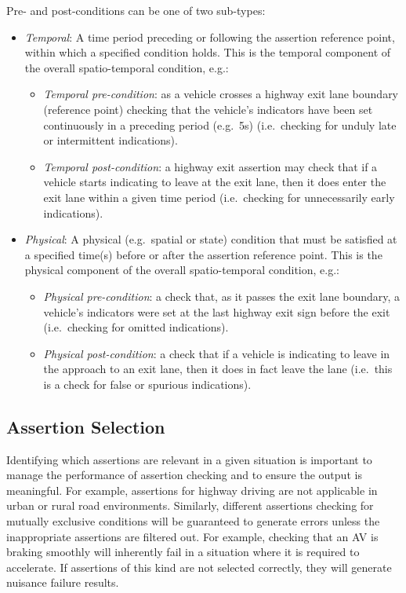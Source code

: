 Pre- and post-conditions can be one of two sub-types:
\begin{itemize}
	\item \textit{Temporal}: A time period preceding or following the assertion reference point, within which a specified condition holds. This is the temporal component of the overall spatio-temporal condition, e.g.:%
	\begin{itemize}
		\item \textit{Temporal pre-condition}: as a vehicle crosses a highway exit lane boundary (reference point) checking that the vehicle's indicators have been set continuously in a preceding period (e.g.\ 5s) (i.e.\ checking for unduly late or intermittent indications).
		\item\textit{Temporal post-condition}: a highway exit assertion may check that if a vehicle starts indicating to leave at the exit lane, then it does enter the exit lane within a given time period (i.e.\ checking for unnecessarily early indications).
	\end{itemize}
	
	\item \textit{Physical}: A physical (e.g.\ spatial or state) condition that must be satisfied at a specified time(s) before or after the assertion reference point. This is the physical component of the overall spatio-temporal condition, e.g.:%
	\begin{itemize}
		\item \textit{Physical pre-condition}: a check that, as it passes the exit lane boundary, a vehicle's indicators were set at the last highway exit sign before the exit (i.e.\ checking for omitted indications).
		\item \textit{Physical post-condition}: a check that if a vehicle is indicating to leave in the approach to an exit lane, then it does in fact leave the lane (i.e.\ this is a check for false or spurious indications).
	\end{itemize} 
\end{itemize}

\subsection{Assertion Selection} \label{assertion_triggers}
Identifying which assertions are relevant in a given situation is important to manage the performance of assertion checking and to ensure the output is meaningful. For example, assertions for highway driving are not applicable in urban or rural road environments. %
Similarly, different assertions checking for mutually exclusive conditions will be guaranteed to generate errors unless the inappropriate assertions are filtered out. For example, checking that an AV is braking smoothly will inherently fail in a situation where it is required to accelerate. If assertions of this kind are not selected correctly, they will generate nuisance failure results. 

